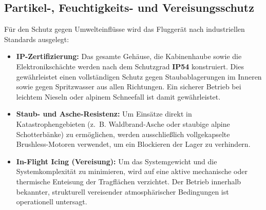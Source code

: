 \subsection{Partikel-, Feuchtigkeits- und Vereisungsschutz}
Für den Schutz gegen Umwelteinflüsse wird das Fluggerät nach industriellen Standards ausgelegt:
\begin{itemize}
    \item \textbf{IP-Zertifizierung:} Das gesamte Gehäuse, die Kabinenhaube sowie die Elektronikschächte werden nach dem Schutzgrad \textbf{IP54} konstruiert. 
                                      Dies gewährleistet einen vollständigen Schutz gegen Staubablagerungen im Inneren sowie gegen Spritzwasser aus allen Richtungen. 
                                      Ein sicherer Betrieb bei leichtem Nieseln oder alpinem Schneefall ist damit gewährleistet.
    \item \textbf{Staub- und Asche-Resistenz:} Um Einsätze direkt in Katastrophengebieten (z.~B. Waldbrand-Asche oder staubige alpine Schotterbänke) zu ermöglichen, werden ausschließlich vollgekapselte Brushless-Motoren verwendet, 
                                               um ein Blockieren der Lager zu verhindern.
    \item \textbf{In-Flight Icing (Vereisung):} Um das Systemgewicht und die Systemkomplexität zu minimieren, wird auf eine aktive mechanische oder thermische Enteisung der Tragflächen verzichtet. 
                                                Der Betrieb innerhalb bekannter, strukturell vereisender atmosphärischer Bedingungen ist operationell untersagt.
\end{itemize}


